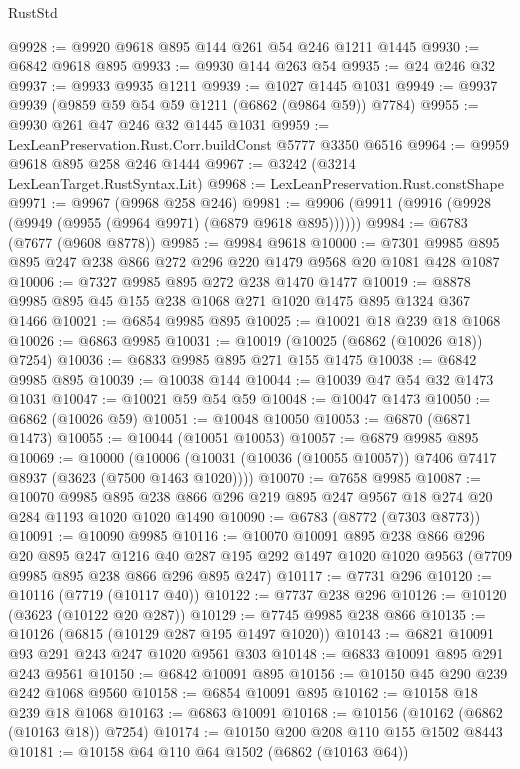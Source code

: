 \begin{lexlean}{RustStd}
\begin{coremodule}
@9928 := @9920 @9618 @895 @144 @261 @54 @246 @1211 @1445
@9930 := @6842 @9618 @895
@9933 := @9930 @144 @263 @54
@9935 := @24 @246 @32
@9937 := @9933 @9935 @1211
@9939 := @1027 @1445 @1031
@9949 := @9937 @9939 (@9859 @59 @54 @59 @1211 (@6862 (@9864 @59)) @7784)
@9955 := @9930 @261 @47 @246 @32 @1445 @1031
@9959 := LexLeanPreservation.Rust.Corr.buildConst @5777 @3350 @6516
@9964 := @9959 @9618 @895 @258 @246 @1444
@9967 := @3242 (@3214 LexLeanTarget.RustSyntax.Lit)
@9968 := LexLeanPreservation.Rust.constShape
@9971 := @9967 (@9968 @258 @246)
@9981 := @9906 (@9911 (@9916 (@9928 (@9949 (@9955 (@9964 @9971) (@6879 @9618 @895))))))
@9984 := @6783 (@7677 (@9608 @8778))
@9985 := @9984 @9618
@10000 := @7301 @9985 @895 @895 @247 @238 @866 @272 @296 @220 @1479 @9568 @20 @1081 @428 @1087
@10006 := @7327 @9985 @895 @272 @238 @1470 @1477
@10019 := @8878 @9985 @895 @45 @155 @238 @1068 @271 @1020 @1475 @895 @1324 @367 @1466
@10021 := @6854 @9985 @895
@10025 := @10021 @18 @239 @18 @1068
@10026 := @6863 @9985
@10031 := @10019 (@10025 (@6862 (@10026 @18)) @7254)
@10036 := @6833 @9985 @895 @271 @155 @1475
@10038 := @6842 @9985 @895
@10039 := @10038 @144
@10044 := @10039 @47 @54 @32 @1473 @1031
@10047 := @10021 @59 @54 @59
@10048 := @10047 @1473
@10050 := @6862 (@10026 @59)
@10051 := @10048 @10050
@10053 := @6870 (@6871 @1473)
@10055 := @10044 (@10051 @10053)
@10057 := @6879 @9985 @895
@10069 := @10000
    (@10006 (@10031 (@10036 (@10055 @10057)) @7406 @7417 @8937 (@3623 (@7500 @1463 @1020))))
@10070 := @7658 @9985
@10087 := @10070
    @9985
    @895
    @238
    @866
    @296
    @219
    @895
    @247
    @9567
    @18
    @274
    @20
    @284
    @1193
    @1020
    @1020
    @1490
@10090 := @6783 (@8772 (@7303 @8773))
@10091 := @10090 @9985
@10116 := @10070
    @10091
    @895
    @238
    @866
    @296
    @20
    @895
    @247
    @1216
    @40
    @287
    @195
    @292
    @1497
    @1020
    @1020
    @9563
    (@7709 @9985 @895 @238 @866 @296 @895 @247)
@10117 := @7731 @296
@10120 := @10116 (@7719 (@10117 @40))
@10122 := @7737 @238 @296
@10126 := @10120 (@3623 (@10122 @20 @287))
@10129 := @7745 @9985 @238 @866
@10135 := @10126 (@6815 (@10129 @287 @195 @1497 @1020))
@10143 := @6821 @10091 @93 @291 @243 @247 @1020 @9561 @303
@10148 := @6833 @10091 @895 @291 @243 @9561
@10150 := @6842 @10091 @895
@10156 := @10150 @45 @290 @239 @242 @1068 @9560
@10158 := @6854 @10091 @895
@10162 := @10158 @18 @239 @18 @1068
@10163 := @6863 @10091
@10168 := @10156 (@10162 (@6862 (@10163 @18)) @7254)
@10174 := @10150 @200 @208 @110 @155 @1502 @8443
@10181 := @10158 @64 @110 @64 @1502 (@6862 (@10163 @64))

\end{coremodule}
\end{lexlean}
